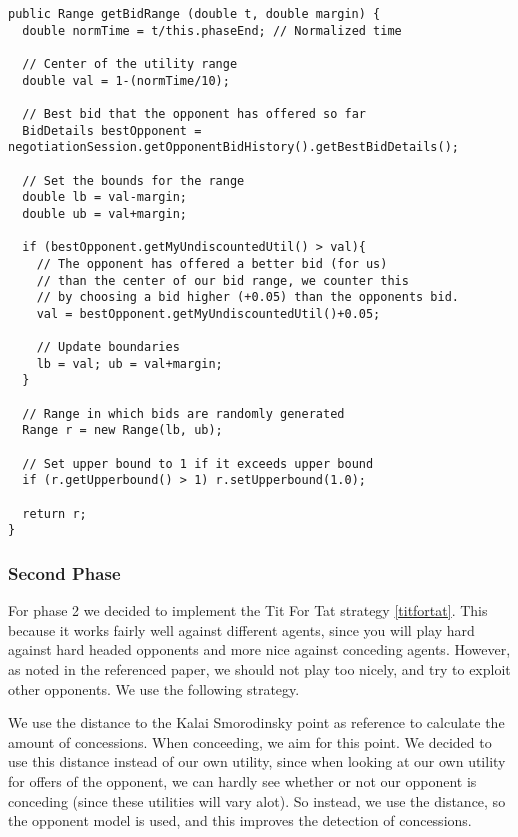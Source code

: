 \begin{lstlisting}[caption=Code for calculating bid range as function of normalized time, label=code:getrangefunctionfirstphase]
public Range getBidRange (double t, double margin) {
  double normTime = t/this.phaseEnd; // Normalized time
  
  // Center of the utility range
  double val = 1-(normTime/10);
  
  // Best bid that the opponent has offered so far
  BidDetails bestOpponent = negotiationSession.getOpponentBidHistory().getBestBidDetails();
  
  // Set the bounds for the range
  double lb = val-margin;
  double ub = val+margin;
  
  if (bestOpponent.getMyUndiscountedUtil() > val){
    // The opponent has offered a better bid (for us)
    // than the center of our bid range, we counter this
    // by choosing a bid higher (+0.05) than the opponents bid.
    val = bestOpponent.getMyUndiscountedUtil()+0.05;
    
    // Update boundaries
    lb = val; ub = val+margin;
  }
  
  // Range in which bids are randomly generated
  Range r = new Range(lb, ub); 
  
  // Set upper bound to 1 if it exceeds upper bound
  if (r.getUpperbound() > 1) r.setUpperbound(1.0);
  
  return r;
}
\end{lstlisting}

\subsubsection{Second Phase}

For phase 2 we decided to implement the Tit For Tat strategy \ref{titfortat}.
This because it works fairly well against different agents, since you will play
hard against hard headed opponents and more nice against conceding agents.
However, as noted in the referenced paper, we should not play too nicely,
and try to exploit other opponents. We use the following strategy.

We use the distance to the Kalai Smorodinsky point as reference to calculate
the amount of concessions. When conceeding, we aim for this point.
We decided to use this distance instead of our own utility, since when looking
at our own utility for offers of the opponent, we can hardly see whether or not
our opponent is conceding (since these utilities will vary alot).
So instead, we use the distance, so the opponent model is used, and 
this improves the detection of concessions.

